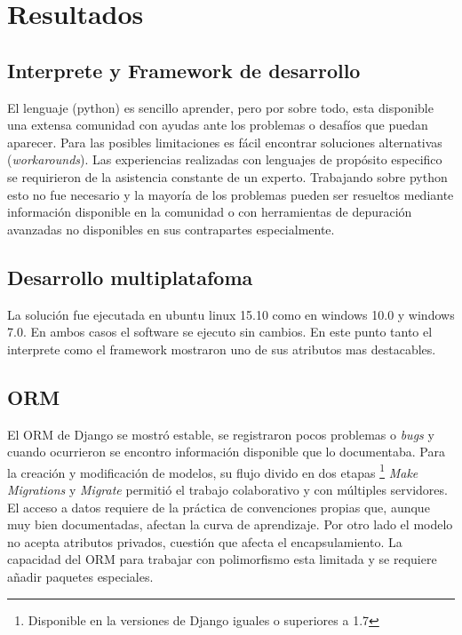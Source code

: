 \documentclass[twoside,twocolumn]{article}
\begin{document}
\section{Resultados}
\label{sec:resultados}


\subsection{Interprete y Framework de desarrollo}
El lenguaje (python) es sencillo aprender, pero por sobre todo, esta disponible 
una extensa comunidad con ayudas ante los problemas o desafíos que puedan 
aparecer. Para las posibles limitaciones es fácil 
encontrar soluciones alternativas (\textit{workarounds}). Las experiencias 
realizadas con lenguajes de propósito especifico se requirieron de la 
asistencia constante de un experto. Trabajando sobre python esto no fue 
necesario y la mayoría de los problemas pueden ser resueltos mediante 
información disponible en la comunidad o con herramientas de depuración 
avanzadas no disponibles en sus contrapartes especialmente.



\subsection{Desarrollo multiplatafoma}
La solución fue ejecutada en ubuntu linux 15.10 como en windows 10.0 y windows 
7.0. En ambos casos el software se ejecuto sin cambios. En este punto tanto el 
interprete como el framework mostraron uno de sus atributos mas destacables.


\subsection{ORM}
El ORM de Django se mostró estable, se registraron pocos problemas o 
\textit{bugs} y cuando ocurrieron se encontro información disponible que lo 
documentaba. Para la creación y modificación de modelos, su flujo divido en 
dos etapas \footnote{Disponible en la versiones de Django iguales o superiores 
a 1.7} \textit{Make Migrations} y \textit{Migrate} permitió el trabajo 
colaborativo y con múltiples servidores. El acceso a datos requiere de la 
práctica de convenciones propias que, aunque muy bien documentadas, afectan la 
curva de aprendizaje. 
Por otro lado el modelo no acepta atributos privados, cuestión 
que afecta el encapsulamiento. La capacidad del ORM para trabajar con 
polimorfismo esta limitada y se requiere añadir paquetes especiales.
\end{document}
